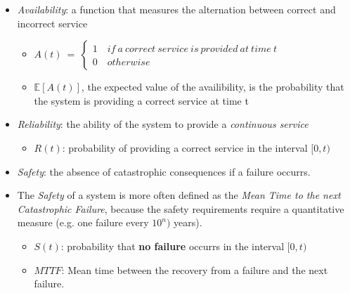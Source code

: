 \begin{itemize}
	\item \textsl{Availability}: a function that measures the alternation between correct and incorrect service
	\vspace{0.4cm}
	\begin{itemize}
		\item[]
	$
		A(t)\: =\: \begin{cases}
		1\quad if\: a\ correct\: service\: is\: provided\: at\: time\: t \\
		0\quad otherwise
		\end{cases}
	$
	\vspace{0.2cm}
		\item[] $\mathbb{E}[A(t)]$, the expected value of the availibility, is the probability that the system is providing a correct service at time t
	\end{itemize}
\end{itemize}

\begin{itemize}
	\item \textsl{Reliability}: the ability of the system to provide a \textsl{continuous service}
	\vspace{0.4cm}
	\begin{itemize}
		\item[] $R(t)$: probability of providing a correct service in the interval $[0, t)$
	\end{itemize}
\end{itemize}

\begin{itemize}
	\item \textsl{Safety}: the absence of catastrophic consequences if a failure occurrs.
	\item The \textsl{Safety} of a system is more often defined as the \textsl{Mean Time to the next Catastrophic Failure}, because the safety requirements require a quantitative measure (e.g. one failure every $10^{n})$ years).
	\vspace{0.4cm}
	\begin{itemize}
		\item[] $S(t)$: probability that \textbf{no failure} occurrs in the interval $[0,t)$
		\vspace{0.2cm}
		\item[] $MTTF$: Mean time between the recovery from a failure and the next failure.
	\end{itemize}
\end{itemize}

